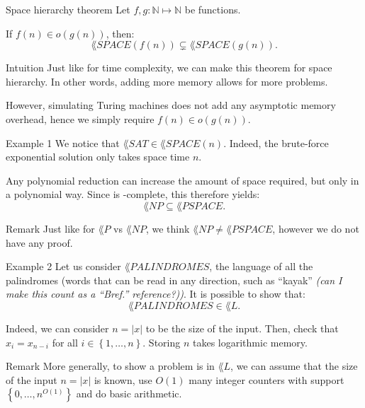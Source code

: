 \documentclass[a4paper]{article}
\begin{document}
\begin{parag}{Space hierarchy theorem}
    Let $f, g: \mathbb{N} \mapsto \mathbb{N}$ be functions.

    If $f\left(n\right) \in o\left(g\left(n\right)\right)$, then: 
    \[\lang{SPACE}\left(f\left(n\right)\right) \subsetneq \lang{SPACE}\left(g\left(n\right)\right).\]

    \begin{subparag}{Intuition}
        Just like for time complexity, we can make this theorem for space hierarchy. In other words, adding more memory allows for more problems.

        However, simulating Turing machines does not add any asymptotic memory overhead, hence we simply require $f\left(n\right) \in o\left(g\left(n\right)\right)$.
    \end{subparag}
\end{parag}

\begin{parag}{Example 1}
    We notice that $\lang{SAT} \in \lang{SPACE}\left(n\right)$. Indeed, the brute-force exponential solution only takes space time $n$.

    Any polynomial reduction can increase the amount of space required, but only in a polynomial way. Since  is -complete, this therefore yields: 
    \[\lang{NP} \subseteq \lang{PSPACE}.\]

    \begin{subparag}{Remark}
        Just like for $\lang{P}$ vs $\lang{NP}$, we think $\lang{NP} \neq \lang{PSPACE}$, however we do not have any proof.
    \end{subparag}
\end{parag}

\begin{parag}{Example 2}
    Let us consider $\lang{PALINDROMES}$, the language of all the palindromes (words that can be read in any direction, such as ``kayak'' \textit{(can I make this count as a ``Bref.'' reference?))}. It is possible to show that: 
    \[\lang{PALINDROMES} \in \lang{L}.\]
    
    Indeed, we can consider $n = \left|x\right|$ to be the size of the input. Then, check that $x_i = x_{n-i}$ for all $i \in \left\{1, \ldots, n\right\}$. Storing $n$ takes logarithmic memory.

    \begin{subparag}{Remark}
        More generally, to show a problem is in $\lang{L}$, we can assume that the size of the input $n = \left|x\right|$ is known, use $O\left(1\right)$ many integer counters with support $\left\{0, \ldots, n^{O\left(1\right)}\right\}$ and do basic arithmetic.
    \end{subparag}
\end{parag}
\end{document}
